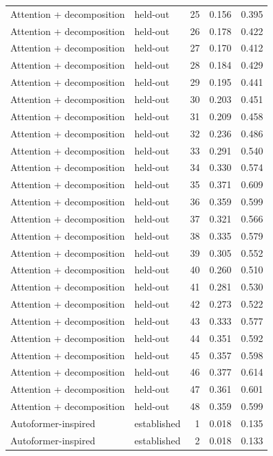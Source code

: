 \begin{tabular}{llrrr}
Attention + decomposition & held-out & 25 & 0.156 & 0.395 \\
Attention + decomposition & held-out & 26 & 0.178 & 0.422 \\
Attention + decomposition & held-out & 27 & 0.170 & 0.412 \\
Attention + decomposition & held-out & 28 & 0.184 & 0.429 \\
Attention + decomposition & held-out & 29 & 0.195 & 0.441 \\
Attention + decomposition & held-out & 30 & 0.203 & 0.451 \\
Attention + decomposition & held-out & 31 & 0.209 & 0.458 \\
Attention + decomposition & held-out & 32 & 0.236 & 0.486 \\
Attention + decomposition & held-out & 33 & 0.291 & 0.540 \\
Attention + decomposition & held-out & 34 & 0.330 & 0.574 \\
Attention + decomposition & held-out & 35 & 0.371 & 0.609 \\
Attention + decomposition & held-out & 36 & 0.359 & 0.599 \\
Attention + decomposition & held-out & 37 & 0.321 & 0.566 \\
Attention + decomposition & held-out & 38 & 0.335 & 0.579 \\
Attention + decomposition & held-out & 39 & 0.305 & 0.552 \\
Attention + decomposition & held-out & 40 & 0.260 & 0.510 \\
Attention + decomposition & held-out & 41 & 0.281 & 0.530 \\
Attention + decomposition & held-out & 42 & 0.273 & 0.522 \\
Attention + decomposition & held-out & 43 & 0.333 & 0.577 \\
Attention + decomposition & held-out & 44 & 0.351 & 0.592 \\
Attention + decomposition & held-out & 45 & 0.357 & 0.598 \\
Attention + decomposition & held-out & 46 & 0.377 & 0.614 \\
Attention + decomposition & held-out & 47 & 0.361 & 0.601 \\
Attention + decomposition & held-out & 48 & 0.359 & 0.599 \\
Autoformer-inspired & established & 1 & 0.018 & 0.135 \\
Autoformer-inspired & established & 2 & 0.018 & 0.133 \\

\end{tabular}
